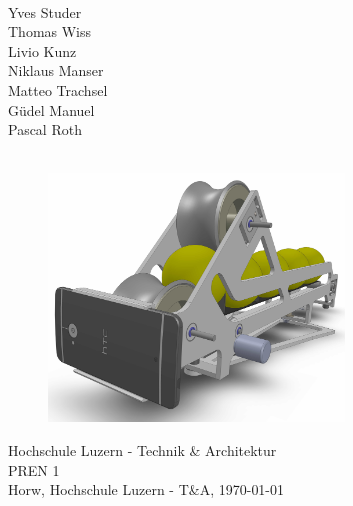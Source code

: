 \begin{titlepage}
    \begin{center}     
        \\
        \vspace*{1.2cm}
        Yves Studer\\
        Thomas Wiss\\
        Livio Kunz\\
        Niklaus Manser\\
        Matteo Trachsel\\
        Güdel Manuel\\
        Pascal Roth\\
        \vspace*{1.2cm}
        {\Huge \myTitel}\\
        \vspace*{1cm}
        \begin{figure}[h!]
            \centering
            \includegraphics[width=0.7\textwidth]{Enddokumentation/Titelbild.JPG}
        \end{figure}
        \vspace*{2cm}
        {\normalsize Hochschule Luzern - Technik \& Architektur}\\
        {\normalsize PREN 1}\\
        \vspace*{0.6cm}
        {\normalsize Horw, Hochschule Luzern - T\&A, \today}\\
    \end{center}
\end{titlepage}
